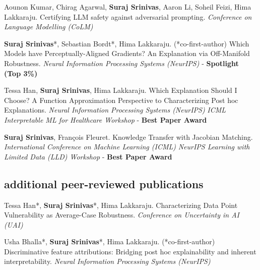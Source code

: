 \documentclass[11pt, a4paper, english]{moderncv}        %
\newcommand{\cvsubsection}[1]{\vspace{0.3cm}\subsection{\large{{#1}}}}
\begin{document}
\vspace*{0.25em}

 {Aounon Kumar, Chirag Agarwal, \textbf{Suraj Srinivas}, Aaron Li, Soheil Feizi, Hima Lakkaraju. \newline Certifying LLM safety against adversarial prompting. 
\newline \textit{Conference on Language Modelling (CoLM)}}

\vspace*{0.25em}

 {\textbf{Suraj Srinivas}*, Sebastian Bordt*, Hima Lakkaraju. (*co-first-author) \newline Which Models have Perceptually-Aligned Gradients? An Explanation via Off-Manifold Robustness.
\newline \textit{Neural Information Processing Systems (NeurIPS)} - \textbf{Spotlight (Top 3\%)}}
\vspace*{0.25em}

 {Tessa Han, \textbf{Suraj Srinivas}, Hima Lakkaraju. 
\newline Which Explanation Should I Choose? A Function Approximation Perspective to Characterizing Post hoc Explanations.
\newline \textit{Neural Information Processing Systems (NeurIPS)} \newline \textit{ICML Interpretable ML for Healthcare Workshop} - \textbf{Best Paper Award}}
\vspace*{0.25em}

 {\textbf{Suraj Srinivas}, Fran\c{c}ois Fleuret.
\newline Knowledge Transfer with Jacobian Matching.
\newline \textit{International Conference on Machine Learning (ICML)}
\newline \textit{NeurIPS Learning with Limited Data (LLD) Workshop} - \textbf{Best Paper Award}
}
\vspace*{0.25em}

\cvsubsection{additional peer-reviewed publications}


 {Tessa Han*, \textbf{Suraj Srinivas}*, Hima Lakkaraju. 
\newline Characterizing Data Point Vulnerability as Average-Case Robustness. 
\newline \textit{Conference on Uncertainty in AI (UAI)}}
\vspace*{0.25em}

 {Usha Bhalla*, \textbf{Suraj Srinivas}*, Hima Lakkaraju. (*co-first-author) \newline Discriminative feature attributions: Bridging post hoc explainability and inherent interpretability.
\newline \textit{Neural Information Processing Systems (NeurIPS)}}
\vspace*{0.25em}
\end{document}
